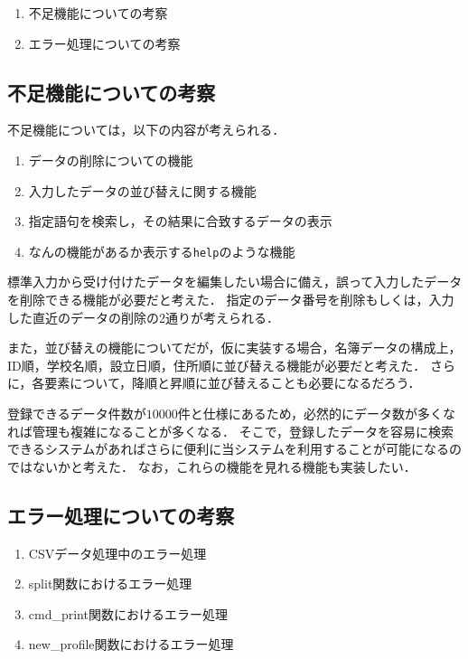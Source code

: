 \documentclass[a4j,11pt]{jarticle}
\begin{document}
\begin{enumerate}
\setlength{\parskip}{2pt} \setlength{\itemsep}{2pt}
    \item 不足機能についての考察
    \item エラー処理についての考察
\end{enumerate}

\subsection{不足機能についての考察}
不足機能については，以下の内容が考えられる．
\begin{enumerate}
\setlength{\parskip}{2pt} \setlength{\itemsep}{2pt}
    \item データの削除についての機能
    \item 入力したデータの並び替えに関する機能
　　\item 指定語句を検索し，その結果に合致するデータの表示
　　\item なんの機能があるか表示する\verb|help|のような機能
\end{enumerate}
標準入力から受け付けたデータを編集したい場合に備え，誤って入力したデータを削除できる機能が必要だと考えた．
指定のデータ番号を削除もしくは，入力した直近のデータの削除の2通りが考えられる．

また，並び替えの機能についてだが，仮に実装する場合，名簿データの構成上，ID順，学校名順，設立日順，住所順に並び替える機能が必要だと考えた．
さらに，各要素について，降順と昇順に並び替えることも必要になるだろう．

登録できるデータ件数が$10000$件と仕様にあるため，必然的にデータ数が多くなれば管理も複雑になることが多くなる．
そこで，登録したデータを容易に検索できるシステムがあればさらに便利に当システムを利用することが可能になるのではないかと考えた．
なお，これらの機能を見れる機能も実装したい．

\subsection{エラー処理についての考察}
\begin{enumerate}
\setlength{\parskip}{2pt} \setlength{\itemsep}{2pt}
    \item CSVデータ処理中のエラー処理
    \item split関数におけるエラー処理
　　\item cmd\_print関数におけるエラー処理
    \item new\_profile関数におけるエラー処理
\end{enumerate}
\end{document}
